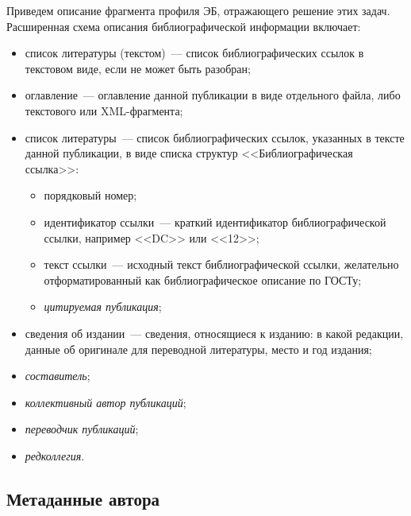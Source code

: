 \begin{multicols}{2}
  Приведем описание фрагмента профиля ЭБ, отражающего решение этих задач. 
Расширенная схема описания библиографической информации включает: 
  \begin{itemize}
\item список литературы (текстом)~--- список библиографических ссылок в текстовом виде, если не 
может быть разобран;
\item оглавление~--- оглавление данной публикации в виде отдельного файла, либо текстового или 
XML-фрагмента;
\item список литературы~--- список библиографических ссылок, указанных в тексте данной публикации, 
в виде списка структур <<Библиографическая ссылка>>:
\begin{itemize}
\item порядковый номер;
\item идентификатор ссылки~--- краткий идентификатор библиографической ссылки, например <<DC>> 
или <<12>>;
\item текст ссылки~--- исходный текст библиографической ссылки, желательно отформатированный как 
библиографическое описание по ГОСТу;
\item \textit{цитируемая публикация}; 
\end{itemize}
\item сведения об издании~--- сведения, относящиеся к изданию: в какой редакции, данные об оригинале 
для переводной литературы, место и год издания;
\item \textit{составитель};
\item \textit{коллективный автор публикаций};
\item \textit{переводчик публикаций};
\item \textit{редколлегия}.
\end{itemize}

\vspace*{-6pt}

  \subsection*{Метаданные автора}
  

\end{multicols}
